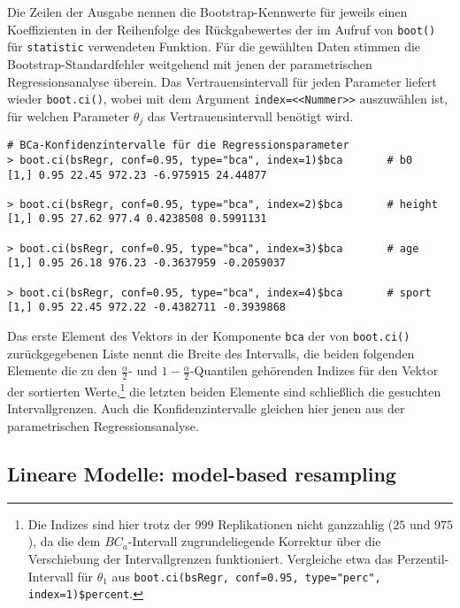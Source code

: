 Die Zeilen der Ausgabe nennen die Bootstrap-Kennwerte für jeweils einen Koeffizienten in der Reihenfolge des Rückgabewertes der im Aufruf von \lstinline!boot()! für \lstinline!statistic! verwendeten Funktion. Für die gewählten Daten stimmen die Bootstrap-Standardfehler weitgehend mit jenen der parametrischen Regressionsanalyse überein. Das Vertrauensintervall für jeden Parameter liefert wieder \lstinline!boot.ci()!, wobei mit dem Argument \lstinline!index=<<Nummer>>! auszuwählen ist, für welchen Parameter $\theta_{j}$ das Vertrauensintervall benötigt wird.
\begin{lstlisting}
# BCa-Konfidenzintervalle für die Regressionsparameter
> boot.ci(bsRegr, conf=0.95, type="bca", index=1)$bca       # b0
[1,] 0.95 22.45 972.23 -6.975915 24.44877

> boot.ci(bsRegr, conf=0.95, type="bca", index=2)$bca       # height
[1,] 0.95 27.62 977.4 0.4238508 0.5991131

> boot.ci(bsRegr, conf=0.95, type="bca", index=3)$bca       # age
[1,] 0.95 26.18 976.23 -0.3637959 -0.2059037

> boot.ci(bsRegr, conf=0.95, type="bca", index=4)$bca       # sport
[1,] 0.95 22.45 972.22 -0.4382711 -0.3939868
\end{lstlisting}

Das erste Element des Vektors in der Komponente \lstinline!bca! der von \lstinline!boot.ci()! zurückgegebenen Liste nennt die Breite des Intervalls, die beiden folgenden Elemente die zu den $\frac{\alpha}{2}$- und $1-\frac{\alpha}{2}$-Quantilen gehörenden Indizes für den Vektor der sortierten Werte,\footnote{Die Indizes sind hier trotz der $999$ Replikationen nicht ganzzahlig ($25$ und $975$), da die dem $BC_{a}$-Intervall zugrundeliegende Korrektur über die Verschiebung der Intervallgrenzen funktioniert. Vergleiche etwa das Perzentil-Intervall für $\theta_{1}$ aus \lstinline!boot.ci(bsRegr, conf=0.95, type="perc", index=1)$percent!.} die letzten beiden Elemente sind schließlich die gesuchten Intervallgrenzen. Auch die Konfidenzintervalle gleichen hier jenen aus der parametrischen Regressionsanalyse.

\subsection{Lineare Modelle: model-based resampling}
\label{sec:bootAnova}

